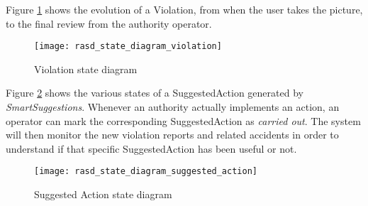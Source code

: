 Figure \ref{fig:violationDiagram} shows the evolution of a Violation, from when
the user takes the picture, to the final review from the authority operator.

\begin{figure}[H]
    \centering
    \texttt{[image: rasd\_state\_diagram\_violation]}
    \caption{Violation state diagram}
    \label{fig:violationDiagram}
\end{figure}

Figure \ref{fig:suggestedActionDiagram} shows the various states of a
SuggestedAction generated by \emph{SmartSuggestions}. Whenever an authority
actually implements an action, an operator can mark the corresponding
SuggestedAction as \emph{carried out}. The system will then monitor the new
violation reports and related accidents in order to understand if that specific
SuggestedAction has been useful or not.

\begin{figure}[H]
    \centering
    \texttt{[image: rasd\_state\_diagram\_suggested\_action]}
    \caption{Suggested Action state diagram}
    \label{fig:suggestedActionDiagram}
\end{figure}
